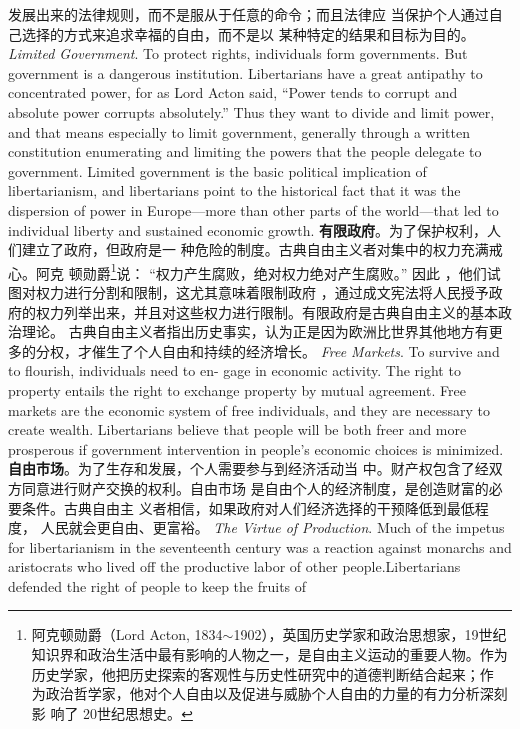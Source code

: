 \begin{paracol}{2}
发展出来的法律规则，而不是服从于任意的命令；而且法律应
当保护个人通过自己选择的方式来追求幸福的自由，而不是以
某种特定的结果和目标为目的。  
\switchcolumn*
\textit{Limited Government}. To protect rights, individuals form governments. But government is a dangerous institution. Libertarians
have a great antipathy to concentrated power, for as Lord Acton
said, ``Power tends to corrupt and absolute power corrupts absolutely.'' Thus they want to divide and limit power, and that
means especially to limit government, generally through a
written constitution enumerating and limiting the powers that
the people delegate to government. Limited government is the
basic political implication of libertarianism, and libertarians
point to the historical fact that it was the dispersion of power in
Europe---more than other parts of the world---that led to individual liberty and sustained economic growth.
\switchcolumn
\textbf{有限政府}。为了保护权利，人们建立了政府，但政府是一
种危险的制度。古典自由主义者对集中的权力充满戒心。阿克
顿勋爵\footnote{阿克顿勋爵（Lord Acton, 1834$\sim$1902），英国历史学家和政治思想家，19世纪知识界和政治生活中最有影响的人物之一，是自由主义运动的重要人物。作为历史学家，他把历史探索的客观性与历史性研究中的道德判断结合起来；作	为政治哲学家，他对个人自由以及促进与威胁个人自由的力量的有力分析深刻影	响了 20世纪思想史。}说： “权力产生腐败，绝对权力绝对产生腐败。” 因此 ，他们试图对权力进行分割和限制，这尤其意味着限制政府 ，通过成文宪法将人民授予政府的权力列举出来，并且对这些权力进行限制。有限政府是古典自由主义的基本政治理论。
古典自由主义者指出历史事实，认为正是因为欧洲比世界其他地方有更多的分权，才催生了个人自由和持续的经济增长。
\switchcolumn*
\textit{Free Markets}. To survive and to flourish, individuals need to en-
gage in economic activity. The right to property entails the
right to exchange property by mutual agreement. Free markets
are the economic system of free individuals, and they are necessary to create wealth. Libertarians believe that people will be
both freer and more prosperous if government intervention in
people's economic choices is minimized.
\switchcolumn
\textbf{自由市场}。为了生存和发展，个人需要参与到经济活动当
中。财产权包含了经双方同意进行财产交换的权利。自由市场
是自由个人的经济制度，是创造财富的必要条件。古典自由主
义者相信，如果政府对人们经济选择的干预降低到最低程度，
人民就会更自由、更富裕。
\switchcolumn*
\textit{The Virtue of Production}. Much of the impetus for libertarianism
in the seventeenth century was a reaction against monarchs and
aristocrats who lived off the productive labor of other people.Libertarians defended the right of people to keep the fruits of

\end{paracol}
